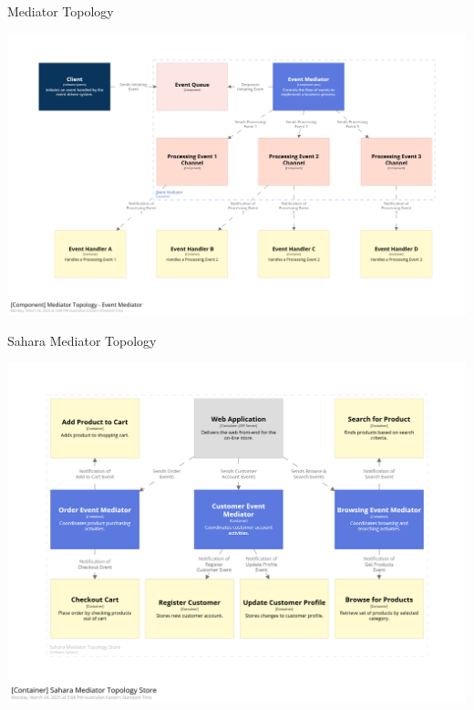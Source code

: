 \documentclass{slide}
\begin{document}
\begin{frame}{Mediator Topology}
    \begin{adjustwidth}{-10mm}{-10mm}
        \centering
        \includegraphics[trim=195 195 195 195,clip,width=1.43\paperheight]{../../notes/event/diagrams/mediator-components.png}
    \end{adjustwidth}
\end{frame}

\begin{frame}{Sahara Mediator Topology}
    \begin{adjustwidth}{-10mm}{-10mm}
        \centering
        \includegraphics[trim=195 195 195 195,clip,width=0.69\paperwidth]{diagrams/sahara-mediator-container.png}
    \end{adjustwidth}
\end{frame}
\end{document}
